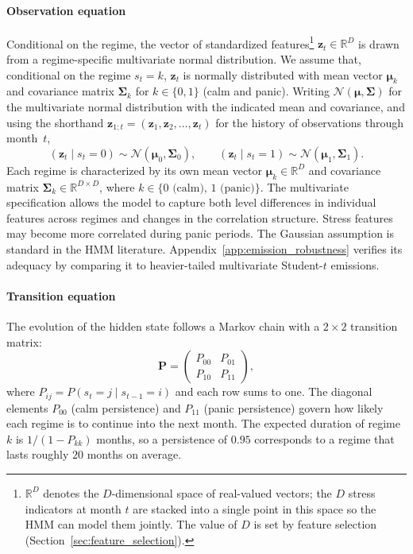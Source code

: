 \paragraph{Observation equation}
Conditional on the regime, the vector of standardized features\footnote{$\mathbb{R}^D$ denotes the $D$-dimensional space of real-valued vectors; the $D$ stress indicators at month $t$ are stacked into a single point in this space so the HMM can model them jointly. The value of $D$ is set by feature selection (Section~\ref{sec:feature_selection}).} $\mathbf{z}_t \in \mathbb{R}^D$ is drawn from a regime-specific multivariate normal distribution. We assume that, conditional on the regime $s_t = k$, $\mathbf{z}_t$ is normally distributed with mean vector $\boldsymbol{\mu}_k$ and covariance matrix $\boldsymbol{\Sigma}_k$ for $k \in \{0, 1\}$ (calm and panic). Writing $\mathcal{N}(\boldsymbol{\mu}, \boldsymbol{\Sigma})$ for the multivariate normal distribution with the indicated mean and covariance, and using the shorthand $\mathbf{z}_{1:t} = (\mathbf{z}_1, \mathbf{z}_2, \dots, \mathbf{z}_t)$ for the history of observations through month~$t$,
\begin{equation}
    (\mathbf{z}_t \mid s_t = 0) \sim \mathcal{N}(\boldsymbol{\mu}_0, \boldsymbol{\Sigma}_0), \qquad (\mathbf{z}_t \mid s_t = 1) \sim \mathcal{N}(\boldsymbol{\mu}_1, \boldsymbol{\Sigma}_1).
\end{equation}
Each regime is characterized by its own mean vector $\boldsymbol{\mu}_k \in \mathbb{R}^D$ and covariance matrix $\boldsymbol{\Sigma}_k \in \mathbb{R}^{D \times D}$, where $k \in \{0\text{ (calm)},\, 1\text{ (panic)}\}$. The multivariate specification allows the model to capture both level differences in individual features across regimes and changes in the correlation structure. Stress features may become more correlated during panic periods. The Gaussian assumption is standard in the HMM literature. Appendix~\ref{app:emission_robustness} verifies its adequacy by comparing it to heavier-tailed multivariate Student-$t$ emissions.

\paragraph{Transition equation}
The evolution of the hidden state follows a Markov chain with a $2 \times 2$ transition matrix:
\begin{equation}
    \mathbf{P} = \left(\begin{array}{cc} P_{00} & P_{01} \\ P_{10} & P_{11} \end{array}\right),
\end{equation}
where $P_{ij} = P(s_t = j \mid s_{t-1} = i)$ and each row sums to one. The diagonal elements $P_{00}$ (calm persistence) and $P_{11}$ (panic persistence) govern how likely each regime is to continue into the next month. The expected duration of regime $k$ is $1/(1 - P_{kk})$ months, so a persistence of $0.95$ corresponds to a regime that lasts roughly $20$ months on average.

